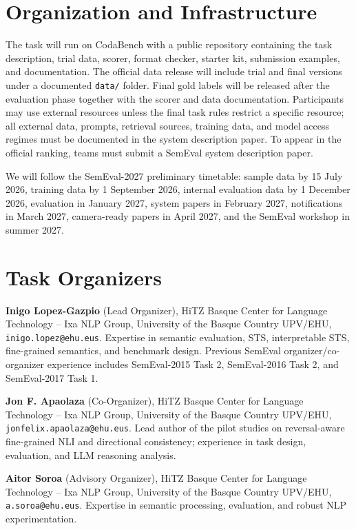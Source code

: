 \documentclass[11pt]{article}
\begin{document}
\section{Organization and Infrastructure}

The task will run on CodaBench with a public repository containing the task description, trial data, scorer, format checker, starter kit, submission examples, and documentation.
The official data release will include trial and final versions under a documented \texttt{data/} folder.
Final gold labels will be released after the evaluation phase together with the scorer and data documentation.
Participants may use external resources unless the final task rules restrict a specific resource; all external data, prompts, retrieval sources, training data, and model access regimes must be documented in the system description paper.
To appear in the official ranking, teams must submit a SemEval system description paper.

We will follow the SemEval-2027 preliminary timetable:
sample data by 15 July 2026, training data by 1 September 2026, internal evaluation data by 1 December 2026, evaluation in January 2027, system papers in February 2027, notifications in March 2027, camera-ready papers in April 2027, and the SemEval workshop in summer 2027.

\section{Task Organizers}

\noindent\textbf{Inigo Lopez-Gazpio} (Lead Organizer), HiTZ Basque Center for Language Technology -- Ixa NLP Group, University of the Basque Country UPV/EHU, \texttt{inigo.lopez@ehu.eus}.
Expertise in semantic evaluation, STS, interpretable STS, fine-grained semantics, and benchmark design.
Previous SemEval organizer/co-organizer experience includes SemEval-2015 Task 2, SemEval-2016 Task 2, and SemEval-2017 Task 1.

\medskip
\noindent\textbf{Jon F. Apaolaza} (Co-Organizer), HiTZ Basque Center for Language Technology -- Ixa NLP Group, University of the Basque Country UPV/EHU, \texttt{jonfelix.apaolaza@ehu.eus}.
Lead author of the pilot studies on reversal-aware fine-grained NLI and directional consistency; experience in task design, evaluation, and LLM reasoning analysis.

\medskip
\noindent\textbf{Aitor Soroa} (Advisory Organizer), HiTZ Basque Center for Language Technology -- Ixa NLP Group, University of the Basque Country UPV/EHU, \texttt{a.soroa@ehu.eus}.
Expertise in semantic processing, evaluation, and robust NLP experimentation.
\end{document}
